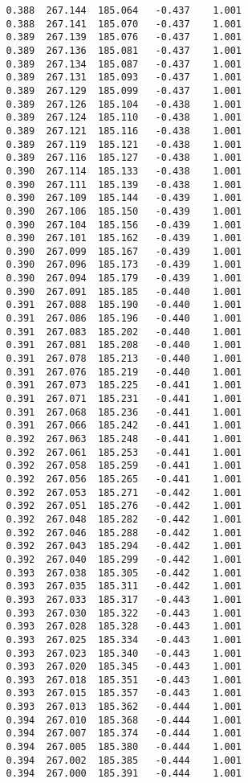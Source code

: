 \begin{verbatim}
   0.388  267.144  185.064   -0.437    1.001
   0.388  267.141  185.070   -0.437    1.001
   0.389  267.139  185.076   -0.437    1.001
   0.389  267.136  185.081   -0.437    1.001
   0.389  267.134  185.087   -0.437    1.001
   0.389  267.131  185.093   -0.437    1.001
   0.389  267.129  185.099   -0.437    1.001
   0.389  267.126  185.104   -0.438    1.001
   0.389  267.124  185.110   -0.438    1.001
   0.389  267.121  185.116   -0.438    1.001
   0.389  267.119  185.121   -0.438    1.001
   0.389  267.116  185.127   -0.438    1.001
   0.390  267.114  185.133   -0.438    1.001
   0.390  267.111  185.139   -0.438    1.001
   0.390  267.109  185.144   -0.439    1.001
   0.390  267.106  185.150   -0.439    1.001
   0.390  267.104  185.156   -0.439    1.001
   0.390  267.101  185.162   -0.439    1.001
   0.390  267.099  185.167   -0.439    1.001
   0.390  267.096  185.173   -0.439    1.001
   0.390  267.094  185.179   -0.439    1.001
   0.390  267.091  185.185   -0.440    1.001
   0.391  267.088  185.190   -0.440    1.001
   0.391  267.086  185.196   -0.440    1.001
   0.391  267.083  185.202   -0.440    1.001
   0.391  267.081  185.208   -0.440    1.001
   0.391  267.078  185.213   -0.440    1.001
   0.391  267.076  185.219   -0.440    1.001
   0.391  267.073  185.225   -0.441    1.001
   0.391  267.071  185.231   -0.441    1.001
   0.391  267.068  185.236   -0.441    1.001
   0.391  267.066  185.242   -0.441    1.001
   0.392  267.063  185.248   -0.441    1.001
   0.392  267.061  185.253   -0.441    1.001
   0.392  267.058  185.259   -0.441    1.001
   0.392  267.056  185.265   -0.441    1.001
   0.392  267.053  185.271   -0.442    1.001
   0.392  267.051  185.276   -0.442    1.001
   0.392  267.048  185.282   -0.442    1.001
   0.392  267.046  185.288   -0.442    1.001
   0.392  267.043  185.294   -0.442    1.001
   0.392  267.040  185.299   -0.442    1.001
   0.393  267.038  185.305   -0.442    1.001
   0.393  267.035  185.311   -0.442    1.001
   0.393  267.033  185.317   -0.443    1.001
   0.393  267.030  185.322   -0.443    1.001
   0.393  267.028  185.328   -0.443    1.001
   0.393  267.025  185.334   -0.443    1.001
   0.393  267.023  185.340   -0.443    1.001
   0.393  267.020  185.345   -0.443    1.001
   0.393  267.018  185.351   -0.443    1.001
   0.393  267.015  185.357   -0.443    1.001
   0.393  267.013  185.362   -0.444    1.001
   0.394  267.010  185.368   -0.444    1.001
   0.394  267.007  185.374   -0.444    1.001
   0.394  267.005  185.380   -0.444    1.001
   0.394  267.002  185.385   -0.444    1.001
   0.394  267.000  185.391   -0.444    1.001

\end{verbatim}
